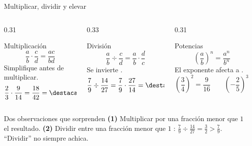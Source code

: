 \documentclass[aspectratio=169,10pt]{beamer}
\begin{document}
\begin{frame}{Multiplicar, dividir y elevar}
  \scriptsize
  \begin{columns}[T,onlytextwidth]
    \begin{column}{0.31\textwidth}
      \begin{block}{Multiplicación}
        \tiny
        \[ \frac{a}{b}\cdot\frac{c}{d} = \frac{ac}{bd} \]
         Simplifique
         antes de multiplicar.
        \[ \frac{2}{3}\cdot\frac{9}{14} = \frac{18}{42}
           = \destacar{\frac{3}{7}} \]
      \end{block}
    \end{column}
    \begin{column}{0.33\textwidth}
      \begin{block}{División}
        \tiny
        \[ \frac{a}{b}\div\frac{c}{d}
           = \frac{a}{b}\cdot\frac{d}{c} \]
        Se invierte .
        \[ \frac{7}{9}\div\frac{14}{27}
           = \frac{7}{9}\cdot\frac{27}{14}
           = \destacar{\frac{3}{2}} \]
      \end{block}
    \end{column}
    \begin{column}{0.31\textwidth}
      \begin{block}{Potencias}
        \tiny
        \[ \left(\frac{a}{b}\right)^{n} = \frac{a^{n}}{b^{n}} \]
        El exponente afecta a .
        \[ \left(\frac{3}{4}\right)^{2} = \frac{9}{16}
           \qquad
           \left(-\frac{2}{5}\right)^{3} = -\frac{8}{125} \]
      \end{block}
    \end{column}
  \end{columns}

  \vspace{-0.05cm}
  \begin{alertblock}{Dos observaciones que sorprenden}
    \tiny
    \textbf{(1)} Multiplicar por una fracción menor que $1$ 
    el resultado. \quad
    \textbf{(2)} Dividir entre una fracción menor que $1$ :
    $\tfrac{7}{9}\div\tfrac{14}{27} = \tfrac{3}{2} > \tfrac{7}{9}$.
    ``Dividir'' no siempre achica.
  \end{alertblock}
\end{frame}
\end{document}
